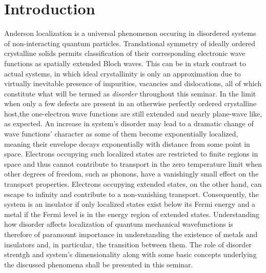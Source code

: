 \documentclass[10pt,a4paper]{article}
\begin{document}
\section{Introduction}
Anderson localization is a universal phenomenon occuring in disordered systems of non-interacting quantum particles. Translational symmetry of ideally ordered crystalline solids permits classification of their corresponding electronic wave functions as spatially extended Bloch waves. This can be in stark contrast to actual systems, in which ideal crystallinity is only an approximation due to virtually inevitable presence of impurities, vacancies and dislocations, all of which constitute what will be termed as \emph{disorder} throughout this seminar. In the limit when only a few defects are present in an otherwise perfectly ordered crystalline host,the one-electron wave functions are still extended and nearly plane-wave like, as expected. An increase in system's disorder may lead to a dramatic change of wave functions' character as some of them become exponentially localized, meaning their envelope decays exponentially with distance from some point in space. Electrons occupying such localized states are restricted to finite regions in space and thus cannot contribute to transport in the zero temperature limit when other degrees of freedom, such as phonons, have a vanishingly small effect on the transport properties. Electrons 
occupying extended states, on the other hand, can escape to infinity and contribute to a non-vanishing transport. Consequently, the system is an insulator if only localized states exist below its Fermi energy and a metal if the Fermi level is in the energy region of extended states. Understanding how disorder affects localization of quantum mechanical wavefunctions is therefore of paramount importance in understanding the existence of metals and insulators and, in particular, the transition between them. The role of disorder strentgh and system's dimensionality along with some basic concepts underlying the discussed phenomena shall be presented in this seminar. 
\end{document}
